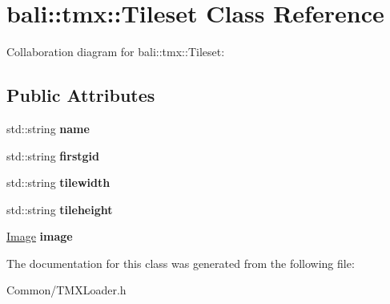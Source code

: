 \hypertarget{classbali_1_1tmx_1_1_tileset}{\section{bali\-:\-:tmx\-:\-:Tileset Class Reference}
\label{classbali_1_1tmx_1_1_tileset}
}


Collaboration diagram for bali\-:\-:tmx\-:\-:Tileset\-:
\subsection*{Public Attributes}
\begin{DoxyCompactItemize}
\item 
\hypertarget{classbali_1_1tmx_1_1_tileset_aa4f7a565197eb703615f08357026518f}{std\-::string {\bfseries name}}\label{classbali_1_1tmx_1_1_tileset_aa4f7a565197eb703615f08357026518f}

\item 
\hypertarget{classbali_1_1tmx_1_1_tileset_a92305e62d352289b82311433c5eb32d7}{std\-::string {\bfseries firstgid}}\label{classbali_1_1tmx_1_1_tileset_a92305e62d352289b82311433c5eb32d7}

\item 
\hypertarget{classbali_1_1tmx_1_1_tileset_a8d5b791bc375d6e0324b33a93c5e2949}{std\-::string {\bfseries tilewidth}}\label{classbali_1_1tmx_1_1_tileset_a8d5b791bc375d6e0324b33a93c5e2949}

\item 
\hypertarget{classbali_1_1tmx_1_1_tileset_a59db1fa9e2d1c51d08c14558141645e2}{std\-::string {\bfseries tileheight}}\label{classbali_1_1tmx_1_1_tileset_a59db1fa9e2d1c51d08c14558141645e2}

\item 
\hypertarget{classbali_1_1tmx_1_1_tileset_aed5a69acbfdf6bf94565d5f984315a1f}{\hyperlink{classbali_1_1tmx_1_1_image}{Image} {\bfseries image}}\label{classbali_1_1tmx_1_1_tileset_aed5a69acbfdf6bf94565d5f984315a1f}

\end{DoxyCompactItemize}


The documentation for this class was generated from the following file\-:\begin{DoxyCompactItemize}
\item 
Common/T\-M\-X\-Loader.\-h\end{DoxyCompactItemize}
